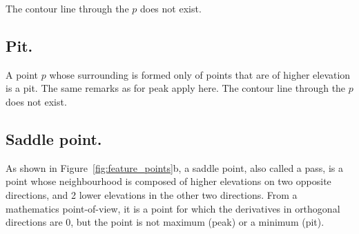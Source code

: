The contour line through the $p$ does not exist.

\subsection{Pit.}
A point $p$ whose surrounding is formed only of points that are of higher elevation is a pit.
The same remarks as for peak apply here.
The contour line through the $p$ does not exist.

\subsection{Saddle point.}%

As shown in Figure~\ref{fig:feature_points}b, a saddle point, also called a pass, is a point whose neighbourhood is composed of higher elevations on two opposite directions, and 2 lower elevations in the other two directions.
From a mathematics point-of-view, it is a point for which the derivatives in orthogonal directions are 0, but the point is not maximum (peak) or a minimum (pit).

%

